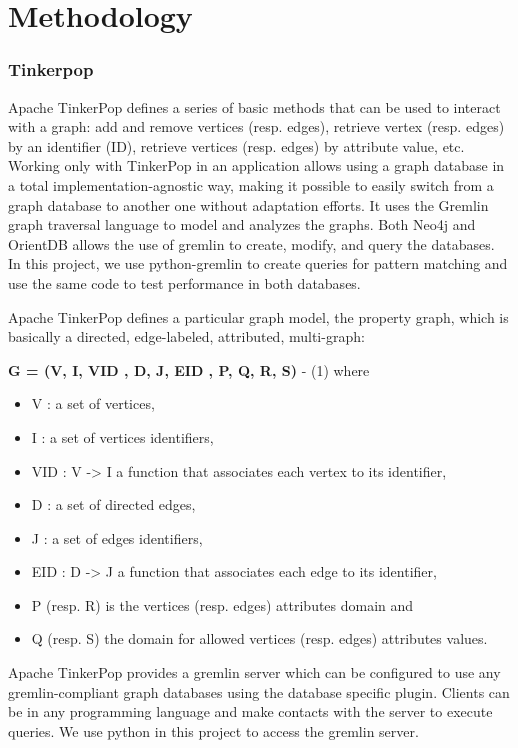 \section{Methodology}

\subsubsection{Tinkerpop}

Apache TinkerPop defines a series of basic methods that can be used to interact with a graph: add and remove vertices (resp. edges), retrieve vertex (resp. edges) by an identifier (ID), retrieve vertices (resp. edges) by attribute value, etc. Working only with TinkerPop in an application allows using a graph database in a total implementation-agnostic way, making it possible to easily switch from a graph database to another one without adaptation efforts. It uses the Gremlin graph traversal language to model and analyzes the graphs. Both Neo4j and OrientDB allows the use of gremlin to create, modify, and query the databases. In this project, we use python-gremlin to create queries for pattern matching and use the same code to test performance in both databases. 

Apache TinkerPop defines a particular graph model, the property graph, which is basically a directed, edge-labeled, attributed, multi-graph:

\textbf{G = (V, I, VID , D, J, EID , P, Q, R, S)} - (1)
where 
\begin{itemize}
\item V : a set of vertices, 
\item I : a set of vertices identifiers, 
\item VID : V -> I a function that associates each vertex to its identifier, 
\item D : a set of directed edges, 
\item J : a set of edges identifiers, 
\item EID : D -> J a function that associates each edge to its identifier, 
\item P (resp. R) is the vertices (resp. edges) attributes domain and 
\item Q (resp. S) the domain for allowed vertices (resp. edges) attributes values.
\end{itemize}

Apache TinkerPop provides a gremlin server which can be configured to use any gremlin-compliant graph databases using the database specific plugin. Clients can be in any programming language and make contacts with the server to execute queries. We use python in this project to access the gremlin server.


